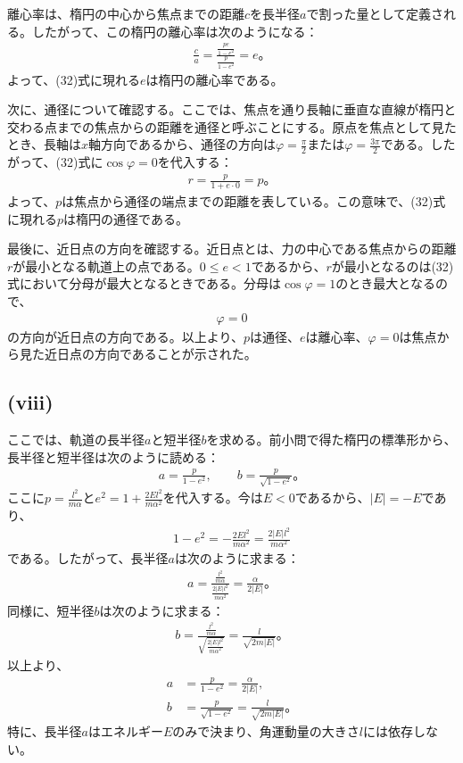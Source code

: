  離心率は、楕円の中心から焦点までの距離$c$を長半径$a$で割った量として定義される。したがって、この楕円の離心率は次のようになる：
  \begin{align*}
    \frac{c}{a}=\frac{\frac{pe}{1-e^2}}{\frac{p}{1-e^2}}=e。
  \end{align*}
  よって、(32)式に現れる$e$は楕円の離心率である。

  次に、通径について確認する。ここでは、焦点を通り長軸に垂直な直線が楕円と交わる点までの焦点からの距離を通径と呼ぶことにする。原点を焦点として見たとき、長軸は$x$軸方向であるから、通径の方向は$\varphi=\frac{\pi}{2}$または$\varphi=\frac{3\pi}{2}$である。したがって、(32)式に$\cos\varphi=0$を代入する：
  \begin{align*}
    r=\frac{p}{1+e\cdot0}=p。
  \end{align*}
  よって、$p$は焦点から通径の端点までの距離を表している。この意味で、(32)式に現れる$p$は楕円の通径である。

  最後に、近日点の方向を確認する。近日点とは、力の中心である焦点からの距離$r$が最小となる軌道上の点である。$0\leq e<1$であるから、$r$が最小となるのは(32)式において分母が最大となるときである。分母は$\cos\varphi=1$のとき最大となるので、
  \begin{align*}
    \varphi=0
  \end{align*}
  の方向が近日点の方向である。以上より、$p$は通径、$e$は離心率、$\varphi=0$は焦点から見た近日点の方向であることが示された。

  \subsection*{(viii)}
  ここでは、軌道の長半径$a$と短半径$b$を求める。前小問で得た楕円の標準形から、長半径と短半径は次のように読める：
  \begin{align*}
    a=\frac{p}{1-e^2},\qquad b=\frac{p}{\sqrt{1-e^2}}。
  \end{align*}
  ここに$p=\frac{l^2}{m\alpha}$と$e^2=1+\frac{2El^2}{m\alpha^2}$を代入する。今は$E<0$であるから、$\left|E\right|=-E$であり、
  \begin{align*}
    1-e^2=-\frac{2El^2}{m\alpha^2}=\frac{2\left|E\right|l^2}{m\alpha^2}
  \end{align*}
  である。したがって、長半径$a$は次のように求まる：
  \begin{align*}
    a=\frac{\frac{l^2}{m\alpha}}{\frac{2\left|E\right|l^2}{m\alpha^2}}=\frac{\alpha}{2\left|E\right|}。
  \end{align*}
  同様に、短半径$b$は次のように求まる：
  \begin{align*}
    b=\frac{\frac{l^2}{m\alpha}}{\sqrt{\frac{2\left|E\right|l^2}{m\alpha^2}}}=\frac{l}{\sqrt{2m\left|E\right|}}。
  \end{align*}
  以上より、
  \begin{align*}
    a&=\frac{p}{1-e^2}=\frac{\alpha}{2\left|E\right|},\tag{35}\\
    b&=\frac{p}{\sqrt{1-e^2}}=\frac{l}{\sqrt{2m\left|E\right|}}。\tag{36}
  \end{align*}
  特に、長半径$a$はエネルギー$E$のみで決まり、角運動量の大きさ$l$には依存しない。

